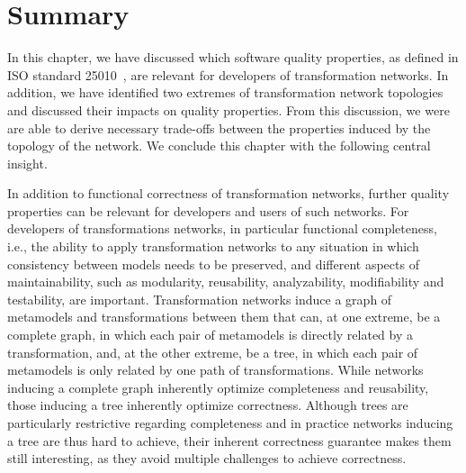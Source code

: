 \section{Summary}

In this chapter, we have discussed which software quality properties, as defined in ISO standard 25010~\cite{iso25010}, are relevant for developers of transformation networks.
In addition, we have identified two extremes of transformation network topologies and discussed their impacts on quality properties.
From this discussion, we were are able to derive necessary trade-offs between the properties induced by the topology of the network.
We conclude this chapter with the following central insight.

\begin{insight}
    In addition to functional correctness of transformation networks, further quality properties can be relevant for developers and users of such networks.
    For developers of transformations networks, in particular functional completeness, i.e., the ability to apply transformation networks to any situation in which consistency between models needs to be preserved, and different aspects of maintainability, such as modularity, reusability, analyzability, modifiability and testability, are important.
    Transformation networks induce a graph of metamodels and transformations between them that can, at one extreme, be a complete graph, in which each pair of metamodels is directly related by a transformation, and, at the other extreme, be a tree, in which each pair of metamodels is only related by one path of transformations.
    While networks inducing a complete graph inherently optimize completeness and reusability, those inducing a tree inherently optimize correctness.
    Although trees are particularly restrictive regarding completeness and in practice networks inducing a tree are thus hard to achieve, their inherent correctness guarantee makes them still interesting, as they avoid multiple challenges to achieve correctness.
\end{insight}
